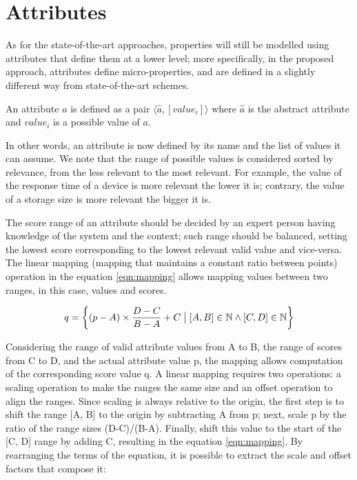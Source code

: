 \section{Attributes}
As for the state-of-the-art approaches, properties will still be modelled using attributes that define them at a lower level; more specifically, in the proposed approach, attributes define micro-properties, and are defined in a slightly different way from state-of-the-art schemes. 

\begin{defn}
An attribute \(a\) is defined as a pair \(\langle \hat{a}, [value_{i}]\rangle\) where \(\hat{a}\) is the abstract attribute and \(value_{i}\) is a possible value of \(a\). 
\end{defn}

In other words, an attribute is now defined by its name and the list of values it can assume. We note that the range of possible values is considered sorted by relevance, from the less relevant to the most relevant. For example, the value of the response time of a device is more relevant the lower it is; contrary, the value of a storage size is more relevant the bigger it is.

The score range of an attribute should be decided by an expert person having knowledge of the system and the context; such range should be balanced, setting the lowest score corresponding to the lowest relevant valid value and vice-versa.
The linear mapping (mapping that maintains a constant ratio between points) operation in the equation \ref{eqn:mapping} allows mapping values between two ranges, in this case, values and scores.

\begin{equation}
\label{eqn:mapping}
    q = \left \{ (p - A) \times \frac{D - C}{B - A} + C \bigm| [A, B] \in \mathbb{N} \wedge [C, D] \in \mathbb{N}  \right \}
\end{equation}

Considering the range of valid attribute values from A to B, the range of scores from C to D, and the actual attribute value p, the mapping allows computation of the corresponding score value q.
A linear mapping requires two operations: a scaling operation to make the ranges the same size and an offset operation to align the ranges. Since scaling is always relative to the origin, the first step is to shift the range [A, B] to the origin by subtracting A from p; next, scale p by the ratio of the range sizes (D-C)/(B-A). Finally, shift this value to the start of the [C, D] range by adding C, resulting in the equation \ref{eqn:mapping}. By rearranging the terms of the equation, it is possible to extract the scale and offset factors that compose it:

